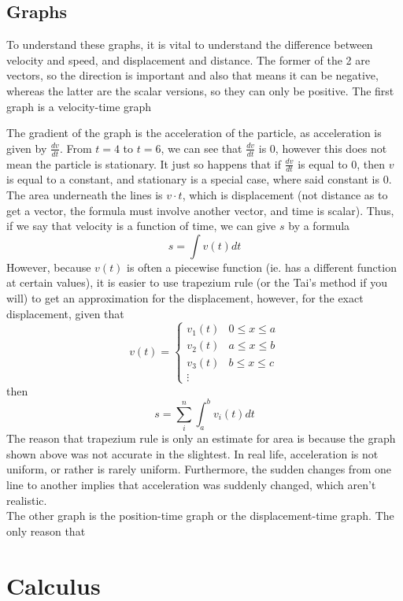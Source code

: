 \documentclass{article}
\begin{document}
\subsection{Graphs}
{To understand these graphs, it is vital to understand the difference between velocity and speed, and displacement and distance. The former of the 2 are vectors, so the direction is important and also that means it can be negative, whereas the latter are the scalar versions, so they can only be positive.}
{The first graph is a velocity-time graph}
\begin{center}
    

\begin{figure}[h]
\end{figure}
\end{center}
{The gradient of the graph is the acceleration of the particle, as acceleration is given by $\frac{dv}{dt}$. From $t=4$ to $t=6$, we can see that $\frac{dv}{dt}$ is 0, however this does not mean the particle is stationary. It just so happens that if $\frac{dv}{dt}$ is equal to 0, then $v$ is equal to a constant, and stationary is a special case, where said constant is 0. \\ The area underneath the lines is $v\cdot t$, which is displacement (not distance as to get a vector, the formula must involve another vector, and time is scalar). Thus, if we say that velocity is a function of time, we can give $s$ by a formula \[s=\int v(t) dt\]However, because $v(t)$ is often a piecewise function (ie. has a different function at certain values), it is easier to use trapezium rule (or the Tai's method if you will) to get an approximation for the displacement, however, for the exact displacement, given that \[v(t)=\begin{cases}v_{1}(t) & 0\leq x \leq a \\v_{2}(t) & a\leq x\leq b \\v_3(t) & b\leq x \leq c \\ \vdots \end{cases}\]then \[s=\sum_{i}^{n} \int^{b}_{a} v_i(t) dt\] The reason that trapezium rule is only an estimate for area is because the graph shown above was not accurate in the slightest. In real life, acceleration is not uniform, or rather is rarely uniform. Furthermore, the sudden changes from one line to another implies that acceleration was suddenly changed, which aren't realistic. \\}
{The other graph is the position-time graph or the displacement-time graph. The only reason that }
\section{Calculus}
\end{document}
